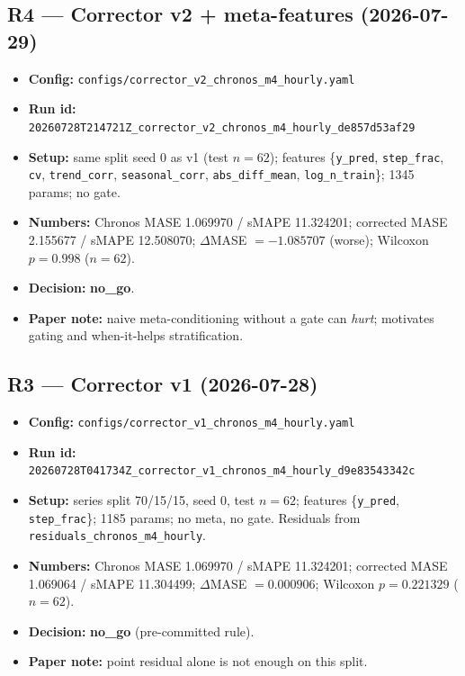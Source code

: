 \subsection*{R4 --- Corrector v2 + meta-features (2026-07-29)}
\begin{itemize}
  \item \textbf{Config:} \texttt{configs/corrector\_v2\_chronos\_m4\_hourly.yaml}
  \item \textbf{Run id:}
        \texttt{20260728T214721Z\_corrector\_v2\_chronos\_m4\_hourly\_de857d53af29}
  \item \textbf{Setup:} same split seed 0 as v1 (test $n=62$);
        features \{\texttt{y\_pred}, \texttt{step\_frac}, \texttt{cv},
        \texttt{trend\_corr}, \texttt{seasonal\_corr}, \texttt{abs\_diff\_mean},
        \texttt{log\_n\_train}\}; 1345 params; no gate.
  \item \textbf{Numbers:} Chronos MASE 1.069970 / sMAPE 11.324201;
        corrected MASE 2.155677 / sMAPE 12.508070;
        $\Delta$MASE $= -1.085707$ (worse); Wilcoxon $p=0.998$ ($n=62$).
  \item \textbf{Decision:} \textbf{no\_go}.
  \item \textbf{Paper note:} naive meta-conditioning without a gate can
        \emph{hurt}; motivates gating and when-it-helps stratification.
\end{itemize}

\subsection*{R3 --- Corrector v1 (2026-07-28)}
\begin{itemize}
  \item \textbf{Config:} \texttt{configs/corrector\_v1\_chronos\_m4\_hourly.yaml}
  \item \textbf{Run id:}
        \texttt{20260728T041734Z\_corrector\_v1\_chronos\_m4\_hourly\_d9e83543342c}
  \item \textbf{Setup:} series split 70/15/15, seed 0, test $n=62$;
        features \{\texttt{y\_pred}, \texttt{step\_frac}\}; 1185 params;
        no meta, no gate. Residuals from
        \texttt{residuals\_chronos\_m4\_hourly}.
  \item \textbf{Numbers:} Chronos MASE 1.069970 / sMAPE 11.324201;
        corrected MASE 1.069064 / sMAPE 11.304499;
        $\Delta$MASE $= 0.000906$; Wilcoxon $p=0.221329$ ($n=62$).
  \item \textbf{Decision:} \textbf{no\_go} (pre-committed rule).
  \item \textbf{Paper note:} point residual alone is not enough on this split.
\end{itemize}

